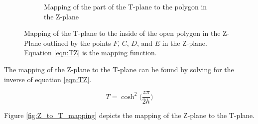 \begin{figure}[h]
\begin{subfigure}[t]{0.45\textwidth}
        \caption{Mapping of the part of the T-plane to the polygon in the Z-plane}
    \end{subfigure} 
    \caption[Mapping of the T-plane to the inside of the open polygon in the Z-Plane]{Mapping of the T-plane to the inside of the open polygon in the Z-Plane outlined by the points $F$, $C$, $D$, and $E$ in the Z-plane. Equation \ref{eqn:TZ} is the mapping function.} 
    \label{fig:T_to_Z_mapping}
 \end{figure}

\par The mapping of the Z-plane to the T-plane can be found by solving for the inverse of equation \ref{eqn:TZ}.

\begin{equation}
     T = \cosh^2\bigg(\frac{z\pi}{2h}\bigg)
     \label{eqn:ZT}
 \end{equation}

\noindent Figure \ref{fig:Z_to_T_mapping} depicts the mapping of the Z-plane to the T-plane.

